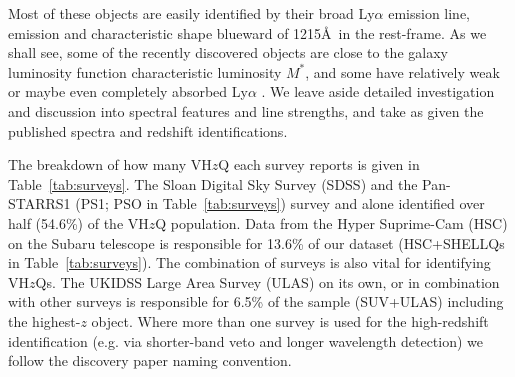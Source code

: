 \documentclass[usenatbib]{mnras}
\begin{document}
Most of these objects are easily identified by their broad Ly$\alpha$
emission line, \nv emission and characteristic shape blueward of
1215\AA\ in the rest-frame. As we shall see, some of the recently
discovered objects are close to the galaxy luminosity function
characteristic luminosity $M^{*}$, and some have relatively weak or
maybe even completely absorbed Ly$\alpha$ \citep[e.g. Figures 7 and 10
in][]{Banados2016}. We leave aside detailed investigation and
discussion into spectral features and line strengths, and take as
given the published spectra and redshift identifications.

The breakdown of how many VH$z$Q each survey reports is given in
Table~\ref{tab:surveys}. The Sloan Digital Sky Survey (SDSS) and the
Pan-STARRS1 (PS1; PSO in Table~\ref{tab:surveys}) survey and alone
identified over half (54.6\%) of the VH$z$Q population. Data from the
Hyper Suprime-Cam (HSC) on the Subaru telescope is responsible for
13.6\% of our dataset (HSC+SHELLQs in Table~\ref{tab:surveys}). The
combination of surveys is also vital for identifying VH$z$Qs. The
UKIDSS Large Area Survey (ULAS) on its own, or in combination with
other surveys is responsible for 6.5\% of the sample (SUV+ULAS)
including the highest-$z$ object. Where more than one survey is used
for the high-redshift identification (e.g. via shorter-band veto and
longer wavelength detection) we follow the discovery paper naming
convention.
\end{document}
